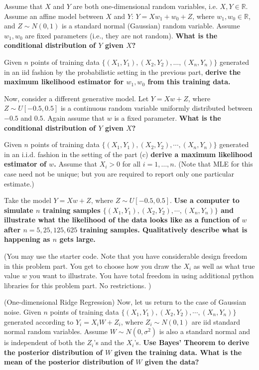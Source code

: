 \documentclass[preview]{standalone}
\begin{document}
\begin{Parts}
\Part Assume that $X$ and $Y$ are both one-dimensional random
variables, i.e. $X, Y \in \mathbb{R}$. Assume an affine model between
$X$ and $Y$: $Y=Xw_1+w_0+Z$, where $w_1, w_0 \in \mathbb{R}$, and $Z \sim
N(0,1)$ is a standard normal (Gaussian) random variable. 
Assume $w_1, w_0$ are fixed parameters (i.e., they are not random). 
{\bf What is the conditional distribution of $Y$ given $X$?}



\Part Given $n$ points of training data $\{(X_1,Y_1),(X_2,Y_2),\ldots, (X_n,Y_n)\}$ generated in
an iid fashion by the probabilistic setting in the previous part, {\bf
  derive the maximum likelihood estimator for $w_1,w_0$ from this training
  data.} 




\Part Now, consider a different generative model.
Let $Y=Xw+Z$, where $Z \sim U[-0.5,0.5]$ is a continuous random
variable uniformly distributed between $-0.5$ and $0.5$. 
Again assume that $w$ is a fixed parameter.
{\bf What is the conditional distribution of $Y$ given $X$?} 



\Part Given $n$ points of training data $\{(X_1,Y_1),(X_2,Y_2),\cdots,
(X_n,Y_n)\}$ generated in an i.i.d. fashion in the setting of the
part (c) {\bf derive a maximum likelihood estimator of $w$.}
Assume that $X_i > 0$ for all $i = 1, \ldots, n$.
(Note that MLE for this case need not be unique; 
but you are required to report only one particular estimate.)



\Part Take the model $Y=Xw +Z$, where $Z \sim U[-0.5,0.5]$. 
{\bf Use a computer
  to simulate $n$ training samples $\{(X_1,Y_1),(X_2,Y_2),\cdots,
(X_n,Y_n)\}$ and illustrate what the likelihood of the data looks like
  as a function of $w$ after $n=5, 25, 125, 625$
  training samples. Qualitatively describe what is happening as $n$
  gets large.}  

(You may use the starter code.
Note that you have considerable design freedom in this problem
part. You get to choose how you draw the $X_i$ as well as what true
value $w$ you want to illustrate. You have total freedom in
using additional python libraries for this problem part. No restrictions.
) 




\Part (One-dimensional Ridge Regression) Now, let us return to the
case of Gaussian noise. Given $n$ points of training data
$\{(X_1,Y_1),(X_2,Y_2),\cdots, (X_n,Y_n)\}$ generated according to
$Y_i=X_i W+Z_i$, where $Z_i \sim N(0,1)$ are iid standard normal random
variables. Assume $W \sim N(0,\sigma^2)$ is also a standard normal and
is independent of both the $Z_i$'s and the $X_i$'s.
{\bf Use Bayes' Theorem to derive the posterior distribution of $W$
  given the training data. What is the mean of the posterior distribution of $W$ given the data?}


\end{Parts}
\end{document}

